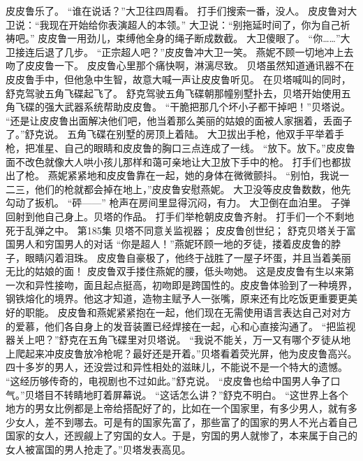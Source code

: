 \documentclass[a4paper,12pt,UTF8,twoside]{ctexbook}
\begin{document}
        皮皮鲁乐了。 
        “谁在说话？”大卫往四周看。 
        打手们搜索一番，没人。 
        皮皮鲁对大卫说：“我现在开始给你表演超人的本领。” 
        大卫说：“别拖延时间了，你为自己祈祷吧。” 
        皮皮鲁一用劲儿，束缚他全身的绳子断成数截。 
        大卫傻眼了。 
        “你……”大卫接连后退了几步。 
        “正宗超人吧？”皮皮鲁冲大卫一笑。 
        燕妮不顾一切地冲上去吻了皮皮鲁一下。 
        皮皮鲁心里那个痛快啊，淋漓尽致。 
        贝塔虽然知道通讯器不在皮皮鲁手中，但他急中生智，故意大喊一声让皮皮鲁听见。 
        在贝塔喊叫的同时，舒克驾驶五角飞碟起飞了。 
        舒克驾驶五角飞碟朝那幢别墅扑去，贝塔开始使用五角飞碟的强大武器系统帮助皮皮鲁。 
        “干脆把那几个坏小子都干掉吧！”贝塔说。 
        “还是让皮皮鲁出面解决他们吧，他当着那么美丽的姑娘的面被人家捆着，丢面子了。”舒克说。 
        五角飞碟在别墅的房顶上着陆。 
        大卫拔出手枪，他双手平举着手枪，把准星、自己的眼睛和皮皮鲁的胸口三点连成了一线。 
        “放下。放下。”皮皮鲁面不改色就像大人哄小孩儿那样和蔼可亲地让大卫放下手中的枪。 
        打手们也都拔出了枪。 
        燕妮紧紧地和皮皮鲁靠在一起，她的身体在微微颤抖。 
        “别怕，我说一二三，他们的枪就都会掉在地上，”皮皮鲁安慰燕妮。 
        大卫没等皮皮鲁数数，他先勾动了扳机。 
        “砰——” 
        枪声在房间里显得沉闷，有力。 
        大卫倒在血泊里。 
        子弹回射到他自己身上。贝塔的作品。 
        打手们举枪朝皮皮鲁齐射。 
        打手们一个不剩地死于乱弹之中。   第185集 
        贝塔不同意关监视器； 
        皮皮鲁创世纪； 
        舒克贝塔关于富国男人和穷国男人的对话   
        “你是超人！”燕妮环顾一地的歹徒，搂着皮皮鲁的脖子，眼睛闪着泪珠。 
        皮皮鲁自豪极了，他终于战胜了一屋子坏蛋，并且当着美丽无比的姑娘的面！ 
        皮皮鲁双手搂住燕妮的腰，低头吻她。 
        这是皮皮鲁有生以来第一次和异性接吻，面且起点挺高，初吻即是跨国性的。皮皮鲁体验到了一种境界，钢铁熔化的境界。他这才知道，造物主赋予人一张嘴，原来还有比吃饭更重要更美好的职能。 
        皮皮鲁和燕妮紧紧抱在一起，他们现在无需使用语言表达自己对对方的爱慕，他们各自身上的发音装置已经焊接在一起，心和心直接沟通了。 
        “把监视器关上吧？”舒克在五角飞碟里对贝塔说。 
        “我说不能关，万一又有哪个歹徒从地上爬起来冲皮皮鲁放冷枪呢？最好还是开着。”贝塔看着荧光屏，他为皮皮鲁高兴。四十多岁的男人，还没尝过和异性相处的滋昧儿，不能说不是一个特大的遗憾。 
        “这经历够传奇的，电视剧也不过如此。”舒克说。 
        “皮皮鲁也给中国男人争了口气。”贝塔目不转睛地盯着屏幕说。 
        “这话怎么讲？”舒克不明白。 
        “这世界上各个地方的男女比例都是上帝给搭配好了的，比如在一个国家里，有多少男人，就有多少女人，差不到哪去。可是有的国家先富了，那些富了的国家的男人不光占着自己国家的女人，还觊觎上了穷国的女人。于是，穷国的男人就惨了，本来属于自己的女人被富国的男人抢走了。”贝塔发表高见。 
\end{document}
